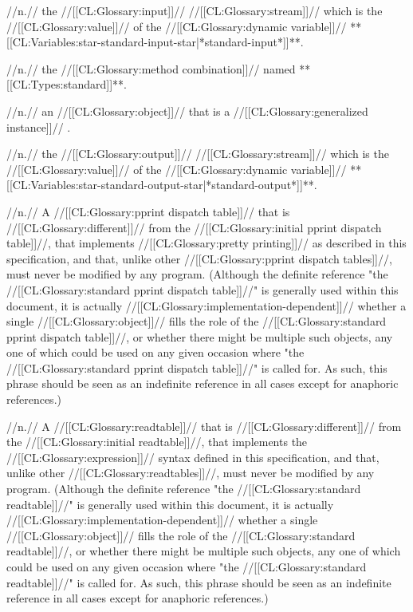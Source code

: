  //n.// the //[[CL:Glossary:input]]// //[[CL:Glossary:stream]]// which is the //[[CL:Glossary:value]]// of the //[[CL:Glossary:dynamic variable]]// **[[CL:Variables:star-standard-input-star|*standard-input*]]**.

 //n.// the //[[CL:Glossary:method combination]]// named **[[CL:Types:standard]]**.

 //n.// an //[[CL:Glossary:object]]// that is a //[[CL:Glossary:generalized instance]]// .

 //n.// the //[[CL:Glossary:output]]// //[[CL:Glossary:stream]]// which is the //[[CL:Glossary:value]]// of the //[[CL:Glossary:dynamic variable]]// **[[CL:Variables:star-standard-output-star|*standard-output*]]**.

 //n.// A //[[CL:Glossary:pprint dispatch table]]// that is //[[CL:Glossary:different]]// from the //[[CL:Glossary:initial pprint dispatch table]]//, that implements //[[CL:Glossary:pretty printing]]// as described in this specification, and that, unlike other //[[CL:Glossary:pprint dispatch tables]]//, must never be modified by any program. (Although the definite reference "the //[[CL:Glossary:standard pprint dispatch table]]//" is generally used within this document, it is actually //[[CL:Glossary:implementation-dependent]]// whether a single //[[CL:Glossary:object]]// fills the role of the //[[CL:Glossary:standard pprint dispatch table]]//, or whether there might be multiple such objects, any one of which could be used on any given occasion where "the //[[CL:Glossary:standard pprint dispatch table]]//" is called for. As such, this phrase should be seen as an indefinite reference in all cases except for anaphoric references.)

 //n.// A //[[CL:Glossary:readtable]]// that is //[[CL:Glossary:different]]// from the //[[CL:Glossary:initial readtable]]//, that implements the //[[CL:Glossary:expression]]// syntax defined in this specification, and that, unlike other //[[CL:Glossary:readtables]]//, must never be modified by any program. (Although the definite reference "the //[[CL:Glossary:standard readtable]]//" is generally used within this document, it is actually //[[CL:Glossary:implementation-dependent]]// whether a single //[[CL:Glossary:object]]// fills the role of the //[[CL:Glossary:standard readtable]]//, or whether there might be multiple such objects, any one of which could be used on any given occasion where "the //[[CL:Glossary:standard readtable]]//" is called for. As such, this phrase should be seen as an indefinite reference in all cases except for anaphoric references.)


